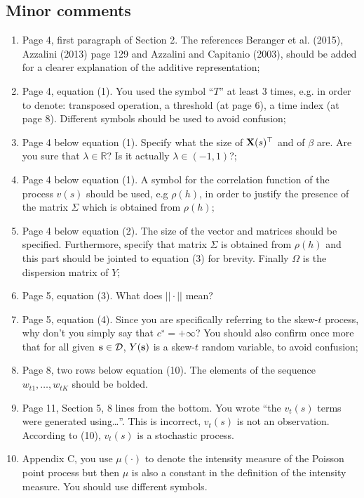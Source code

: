 \documentclass[11pt]{article}
\begin{document}
\subsection*{Minor comments}
\begin{enumerate}[1.]
  \item Page 4, first paragraph of Section 2. The references Beranger et al. (2015), Azzalini (2013) page 129 and Azzalini and Capitanio (2003), should be added for a clearer explanation of the additive representation;

  \item Page 4, equation (1). You used the symbol ``$T$'' at least 3 times, e.g. in order to denote: transposed operation, a threshold (at page 6), a time index (at page 8). Different symbols should be used to avoid confusion;

  \item Page 4 below equation (1). Specify what the size of $\mbox{\bf X}(s)^\top$ and of $\beta$ are. Are you sure that $\lambda \in \mathbb{R}$? Is it actually $\lambda \in (−1,1)$?;

  \item Page 4 below equation (1). A symbol for the correlation function of the process $v(s)$ should be used, e.g $\rho(h)$, in order to justify the presence of the matrix $\Sigma$ which is obtained from $\rho(h)$;

  \item Page 4 below equation (2). The size of the vector and matrices should be specified. Furthermore, specify that matrix $\Sigma$ is obtained from $\rho(h)$ and this part should be jointed to equation (3) for brevity. Finally $\Omega$ is the dispersion matrix of $Y$;

  \item Page 5, equation (3). What does $|| \cdot ||$ mean?

  \item Page 5, equation (4). Since you are specifically referring to the skew-$t$ process, why don’t you simply say that $c^∗ = +\infty$? You should also confirm once more that for all given $\mbox{\bf s} \in {\cal D}$, $Y(\mbox{\bf s})$ is a skew-$t$ random variable, to avoid confusion;

  \item Page 8, two rows below equation (10). The elements of the sequence $w_{t1}, \ldots , w_{tK}$ should be bolded.

  \item Page 11, Section 5, 8 lines from the bottom. You wrote ``the $v_t(s)$ terms were generated using\ldots ''. This is incorrect, $v_t(s)$ is not an observation. According to (10), $v_t(s)$ is a stochastic process.

  \item Appendix C, you use $\mu(\cdot)$ to denote the intensity measure of the Poisson point process but then $\mu$ is also a constant in the definition of the intensity measure. You should use different symbols.
\end{enumerate}
\end{document}
